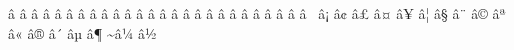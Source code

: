 \mubyte \forall ^^e2^^88^^80\endmubyte %
\mubyte \complement ^^e2^^88^^81\endmubyte %
\mubyte \partial ^^e2^^88^^82\endmubyte %
\mubyte \exists ^^e2^^88^^83\endmubyte %
\mubyte \nexists ^^e2^^88^^84\endmubyte %
\mubyte \emptyset ^^e2^^88^^85\endmubyte %
\mubyte \Delta ^^e2^^88^^86\endmubyte %
\mubyte \nabla ^^e2^^88^^87\endmubyte %
\mubyte \in ^^e2^^88^^88\endmubyte %
\mubyte \ni ^^e2^^88^^8b\endmubyte %
\mubyte \blacksquare ^^e2^^88^^8e\endmubyte %
\mubyte \prod ^^e2^^88^^8f\endmubyte %
\mubyte \coprod ^^e2^^88^^90\endmubyte %
\mubyte \sum ^^e2^^88^^91\endmubyte %
\mubyte \utfminus ^^e2^^88^^92\endmubyte %
\mubyte \mp ^^e2^^88^^93\endmubyte %
\mubyte \dotplus ^^e2^^88^^94\endmubyte %
\mubyte \utfslash ^^e2^^88^^95\endmubyte %
\mubyte \setminus ^^e2^^88^^96\endmubyte %
\mubyte \ast ^^e2^^88^^97\endmubyte %
\mubyte \circ ^^e2^^88^^98\endmubyte %
\mubyte \bullet ^^e2^^88^^99\endmubyte %
\mubyte \surd ^^e2^^88^^9a\endmubyte %
\mubyte \propto ^^e2^^88^^9d\endmubyte %
\mubyte \infty ^^e2^^88^^9e\endmubyte %
\mubyte \angle ^^e2^^88^^a0\endmubyte %
\mubyte \measuredangle ^^e2^^88^^a1\endmubyte %
\mubyte \sphericalangle ^^e2^^88^^a2\endmubyte %
\mubyte \mid ^^e2^^88^^a3\endmubyte %
\mubyte \nmid ^^e2^^88^^a4\endmubyte %
\mubyte \parallel ^^e2^^88^^a5\endmubyte %
\mubyte \nparallel ^^e2^^88^^a6\endmubyte %
\mubyte \land ^^e2^^88^^a7\endmubyte %
\mubyte \lor ^^e2^^88^^a8\endmubyte %
\mubyte \cap ^^e2^^88^^a9\endmubyte %
\mubyte \cup ^^e2^^88^^aa\endmubyte %
\mubyte \intop ^^e2^^88^^ab\endmubyte %
\mubyte \ointop ^^e2^^88^^ae\endmubyte %
\mubyte \therefore ^^e2^^88^^b4\endmubyte %
\mubyte \because ^^e2^^88^^b5\endmubyte %
\mubyte \ratio ^^e2^^88^^b6\endmubyte %
\mubyte \sim ^^e2^^88^^bc\endmubyte %
\mubyte \backsim ^^e2^^88^^bd\endmubyte %
